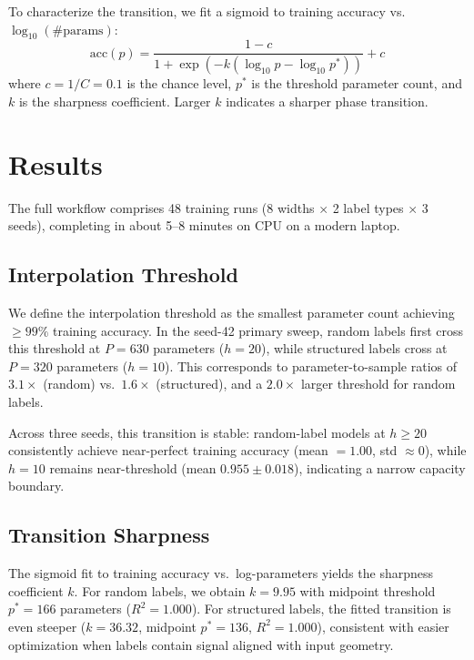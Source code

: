 \documentclass[11pt]{article}
\begin{document}
To characterize the transition, we fit a sigmoid to training accuracy vs.\ $\log_{10}(\text{\#params})$:
\begin{equation}
    \text{acc}(p) = \frac{1 - c}{1 + \exp(-k(\log_{10} p - \log_{10} p^*))} + c
\end{equation}
where $c = 1/C = 0.1$ is the chance level, $p^*$ is the threshold parameter count, and $k$ is the sharpness coefficient. Larger $k$ indicates a sharper phase transition.

\section{Results}

The full workflow comprises 48 training runs (8 widths $\times$ 2 label types $\times$ 3 seeds), completing in about 5--8 minutes on CPU on a modern laptop.

\subsection{Interpolation Threshold}

We define the interpolation threshold as the smallest parameter count achieving $\geq 99\%$ training accuracy. In the seed-42 primary sweep, random labels first cross this threshold at $P=630$ parameters ($h=20$), while structured labels cross at $P=320$ parameters ($h=10$). This corresponds to parameter-to-sample ratios of $3.1\times$ (random) vs.\ $1.6\times$ (structured), and a $2.0\times$ larger threshold for random labels.

Across three seeds, this transition is stable: random-label models at $h\geq 20$ consistently achieve near-perfect training accuracy (mean $=1.00$, std $\approx 0$), while $h=10$ remains near-threshold (mean $0.955 \pm 0.018$), indicating a narrow capacity boundary.

\subsection{Transition Sharpness}

The sigmoid fit to training accuracy vs.\ log-parameters yields the sharpness coefficient $k$. For random labels, we obtain $k=9.95$ with midpoint threshold $p^*=166$ parameters ($R^2=1.000$). For structured labels, the fitted transition is even steeper ($k=36.32$, midpoint $p^*=136$, $R^2=1.000$), consistent with easier optimization when labels contain signal aligned with input geometry.
\end{document}
